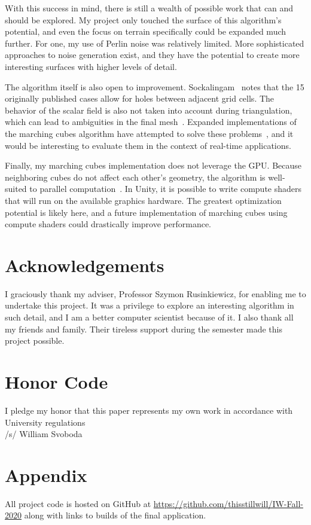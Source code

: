 \documentclass[pageno]{jpaper}
\begin{document}
With this success in mind, there is still a wealth of possible work that can and should be explored. My project only touched the surface of this algorithm's potential, and even the focus on terrain specifically could be expanded much further. For one, my use of Perlin noise was relatively limited. More sophisticated approaches to noise generation exist, and they have the potential to create more interesting surfaces with higher levels of detail.

The algorithm itself is also open to improvement. Sockalingam~\cite{kieran} notes that the 15 originally published cases allow for holes between adjacent grid cells. The behavior of the scalar field is also not taken into account during triangulation, which can lead to ambiguities in the final mesh~\cite{kieran}. Expanded implementations of the marching cubes algorithm have attempted to solve these problems~\cite{kieran}, and it would be interesting to evaluate them in the context of real-time applications.

Finally, my marching cubes implementation does not leverage the GPU. Because neighboring cubes do not affect each other's geometry, the algorithm is well-suited to parallel computation~\cite{kieran}. In Unity, it is possible to write compute shaders that will run on the available graphics hardware. The greatest optimization potential is likely here, and a future implementation of marching cubes using compute shaders could drastically improve performance. 

\section*{Acknowledgements}

I graciously thank my adviser, Professor Szymon Rusinkiewicz, for enabling me to undertake this project. It was a privilege to explore an interesting algorithm in such detail, and I am a better computer scientist because of it. I also thank all my friends and family. Their tireless support during the semester made this project possible.

\section*{Honor Code}

I pledge my honor that this paper represents my own work in accordance with University regulations \\/s/ William Svoboda

\pagebreak




\appendix

\section{Appendix}

All project code is hosted on GitHub at \url{https://github.com/thisstillwill/IW-Fall-2020} along with links to builds of the final application.
\end{document}
